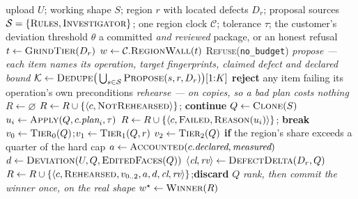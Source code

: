 \documentclass[11pt,onecolumn]{article}
\newcommand{\code}[1]{\texttt{\small #1}}
\begin{document}
\begin{algorithm}[H]
\caption{Tournament repair of one region: rehearse on clones, commit once, review last.}
\label{alg:tournament}
\footnotesize
\begin{algorithmic}[1]
\Require upload $U$; working shape $S$; region $r$ with located defects $D_r$; proposal sources
  $\mathcal{S} = \{\textsc{Rules},\textsc{Investigator}\}$; one region clock $\mathcal{C}$;
  tolerance $\tau$; the customer's deviation threshold $\theta$
\Ensure a committed \emph{and reviewed} package, or an honest refusal
\State $t \gets \textsc{GrindTier}(D_r)$ 
\State $w \gets \mathcal{C}.\textsc{RegionWall}(t)$
 \Return \textsc{Refuse}(\code{no\_budget}) 
\EndIf
\Statex \textit{propose --- each item names its operation, target fingerprints, claimed defect and declared bound}
\State $\mathcal{K} \gets \textsc{Dedupe}\big(\textstyle\bigcup_{s \in \mathcal{S}} \textsc{Propose}(s, r, D_r)\big)[1{:}K]$
\State \textbf{reject} any item failing its operation's own preconditions 
\Statex \textit{rehearse --- on copies, so a bad plan costs nothing}
\State $R \gets \varnothing$
    \State $R \gets R \cup \{\langle c, \textsc{NotRehearsed}\rangle\}$; \textbf{continue}
  \EndIf
  \State $Q \gets \textsc{Clone}(S)$ 
    \State $u_i \gets \textsc{Apply}(Q, c.\textit{plan}_i, \tau)$
      \State $R \gets R \cup \{\langle c, \textsc{Failed}, \textsc{Reason}(u_i)\rangle\}$; \textbf{break}
    \EndIf
  \EndFor
  \State $v_0 \gets \textsc{Tier}_0(Q)$;\quad $v_1 \gets \textsc{Tier}_1(Q, r)$
  \State $v_2 \gets \textsc{Tier}_2(Q)$ \textbf{if} the region's share exceeds a quarter of the hard cap
  \State $a \gets \textsc{Accounted}(c.\textit{declared}, \textit{measured})$ 
  \State $d \gets \textsc{Deviation}(U, Q, \textsc{EditedFaces}(Q))$ 
  \State $\langle \textit{cl}, \textit{rv} \rangle \gets \textsc{DefectDelta}(D_r, Q)$ 
  \State $R \gets R \cup \{\langle c, \textsc{Rehearsed}, v_{0..2}, a, d, \textit{cl}, \textit{rv}\rangle\}$;\quad \textbf{discard} $Q$
\EndFor
\Statex \textit{rank, then commit the winner \emph{once}, on the real shape}
\State $w^\star \gets \textsc{Winner}(R)$ 

\end{algorithmic}
\end{algorithm}
\end{document}
